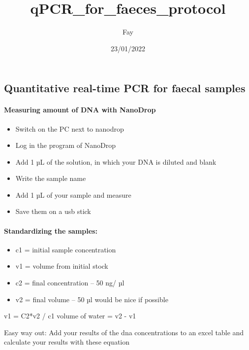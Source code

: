 \documentclass[
]{article}
\title{qPCR\_for\_faeces\_protocol}
\author{Fay}
\date{23/01/2022}
\providecommand{\tightlist}{%
  \setlength{\itemsep}{0pt}\setlength{\parskip}{0pt}}
\begin{document}
\maketitle

\hypertarget{quantitative-real-time-pcr-for-faecal-samples}{%
\subsection{Quantitative real-time PCR for faecal
samples}\label{quantitative-real-time-pcr-for-faecal-samples}}

\hypertarget{measuring-amount-of-dna-with-nanodrop}{%
\paragraph{Measuring amount of DNA with
NanoDrop}\label{measuring-amount-of-dna-with-nanodrop}}

\begin{itemize}
\tightlist
\item
  Switch on the PC next to nanodrop
\item
  Log in the program of NanoDrop
\item
  Add 1 µL of the solution, in which your DNA is diluted and blank
\item
  Write the sample name
\item
  Add 1 µL of your sample and measure
\item
  Save them on a usb stick
\end{itemize}

\hypertarget{standardizing-the-samples}{%
\paragraph{Standardizing the samples:}\label{standardizing-the-samples}}

\begin{itemize}
\tightlist
\item
  c1 = initial sample concentration
\item
  v1 = volume from initial stock
\item
  c2 = final concentration -- 50 ng/ µl
\item
  v2 = final volume -- 50 µl would be nice if possible
\end{itemize}

v1 = C2*v2 / c1 volume of water = v2 - v1

Easy way out: Add your results of the dna concentrations to an excel
table and calculate your results with these equation
\end{document}
